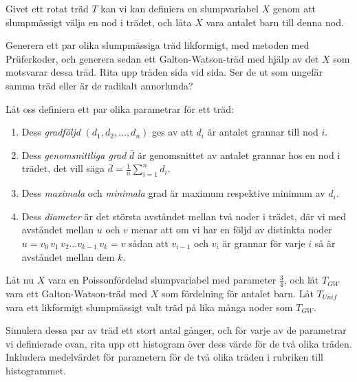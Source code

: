 \documentclass[nobib]{tufte-handout}
\begin{document}
\begin{xca}
    Givet ett rotat träd $T$ kan vi kan definiera en slumpvariabel $X$ genom att slumpmässigt välja en nod i trädet, och låta $X$ vara antalet barn till denna nod.

    Generera ett par olika slumpmässiga träd likformigt, med metoden med Prüferkoder, och generera sedan ett Galton-Watson-träd med hjälp av det $X$ som motsvarar dessa träd. Rita upp träden sida vid sida. Ser de ut som ungefär samma träd eller är de radikalt annorlunda?
\end{xca}

\begin{xca}
    Låt oss definiera ett par olika parametrar för ett träd:
    \begin{enumerate}
        \item Dess \emph{gradföljd} $(d_1,d_2,\ldots,d_n)$ ges av att $d_i$ är antalet grannar till nod $i$.
        \item Dess \emph{genomsnittliga grad} $\bar{d}$ är genomsnittet av antalet grannar hos en nod i trädet, det vill säga $\bar{d} = \frac{1}{n}\sum_{i=1}^{n} d_i$.
        \item Dess \emph{maximala} och \emph{minimala} grad är maximum respektive minimum av $d_i$.
        \item Dess \emph{diameter} är det största avståndet mellan två noder i trädet, där vi med avståndet mellan $u$ och $v$ menar att om vi har en följd av distinkta noder $u = v_0 \, v_1\, v_2\ldots v_{k-1}\, v_k = v$ sådan att $v_{i-1}$ och $v_i$ är grannar för varje $i$ så är avståndet mellan dem $k$.
    \end{enumerate}

    Låt nu $X$ vara en Poissonfördelad slumpvariabel med parameter $\frac{3}{4}$, och låt $T_{GW}$ vara ett Galton-Watson-träd med $X$ som fördelning för antalet barn. Låt $T_{Unif}$ vara ett likformigt slumpmässigt valt träd på lika många noder som $T_{GW}$.

    Simulera dessa par av träd ett stort antal gånger, och för varje av de parametrar vi definierade ovan, rita upp ett histogram över dess värde för de två olika träden. Inkludera medelvärdet för parametern för de två olika träden i rubriken till histogrammet.
\end{xca}
\end{document}
